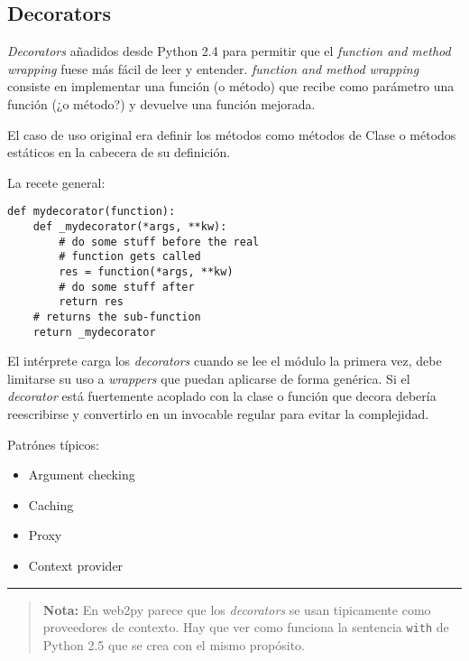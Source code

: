 \documentclass[12pt,spanish,]{article}
\providecommand{\tightlist}{%
  \setlength{\itemsep}{0pt}\setlength{\parskip}{0pt}}
\begin{document}
\subsection{Decorators}\label{decorators}

\emph{Decorators} añadidos desde Python 2.4 para permitir que el
\emph{function and method wrapping} fuese más fácil de leer y entender.
\emph{function and method wrapping} consiste en implementar una función
(o método) que recibe como parámetro una función (¿o método?) y devuelve
una función mejorada.

El caso de uso original era definir los métodos como métodos de Clase o
métodos estáticos en la cabecera de su definición.

La recete general:

\begin{verbatim}
def mydecorator(function):
    def _mydecorator(*args, **kw):
        # do some stuff before the real 
        # function gets called 
        res = function(*args, **kw)
        # do some stuff after
        return res
    # returns the sub-function
    return _mydecorator
\end{verbatim}

El intérprete carga los \emph{decorators} cuando se lee el módulo la
primera vez, debe limitarse su uso a \emph{wrappers} que puedan
aplicarse de forma genérica. Si el \emph{decorator} está fuertemente
acoplado con la clase o función que decora debería reescribirse y
convertirlo en un invocable regular para evitar la complejidad.

Patrónes típicos:

\begin{itemize}
\tightlist
\item
  Argument checking
\item
  Caching
\item
  Proxy
\item
  Context provider
\end{itemize}

\begin{center}\rule{0.5\linewidth}{\linethickness}\end{center}

\begin{quote}
\textbf{Nota:} En web2py parece que los \emph{decorators} se usan
tipicamente como proveedores de contexto. Hay que ver como funciona la
sentencia \texttt{with} de Python 2.5 que se crea con el mismo
propósito.
\end{quote}
\end{document}
